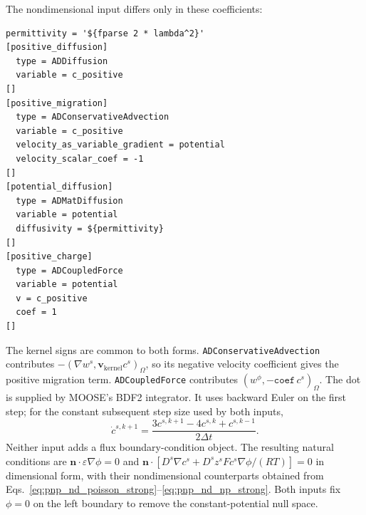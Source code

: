 \documentclass[3p,times]{elsarticle}
\begin{document}
The nondimensional input differs only in these coefficients:
\begin{lstlisting}[basicstyle=\ttfamily\small,columns=fullflexible]
permittivity = '${fparse 2 * lambda^2}'
[positive_diffusion]
  type = ADDiffusion
  variable = c_positive
[]
[positive_migration]
  type = ADConservativeAdvection
  variable = c_positive
  velocity_as_variable_gradient = potential
  velocity_scalar_coef = -1
[]
[potential_diffusion]
  type = ADMatDiffusion
  variable = potential
  diffusivity = ${permittivity}
[]
[positive_charge]
  type = ADCoupledForce
  variable = potential
  v = c_positive
  coef = 1
[]
\end{lstlisting}

The kernel signs are common to both forms. \texttt{ADConservativeAdvection} contributes $-(\nabla w^s,\boldsymbol{v}_{\mathrm{kernel}}c^s)_\Omega$, so its negative velocity coefficient gives the positive migration term. \texttt{ADCoupledForce} contributes $(w^\phi,-\texttt{coef}\,c^s)_\Omega$. The dot is supplied by MOOSE's BDF2 integrator. It uses backward Euler on the first step; for the constant subsequent step size used by both inputs,
\begin{equation}
  \dot{c}^{s,k+1}=\frac{3c^{s,k+1}-4c^{s,k}+c^{s,k-1}}{2\Delta t}.
\end{equation}
Neither input adds a flux boundary-condition object. The resulting natural conditions are $\boldsymbol{n}\cdot\varepsilon\nabla\phi=0$ and $\boldsymbol{n}\cdot[D^s\nabla c^s+D^sz^sF c^s\nabla\phi/(RT)]=0$ in dimensional form, with their nondimensional counterparts obtained from Eqs.~\eqref{eq:pnp_nd_poisson_strong}--\eqref{eq:pnp_nd_np_strong}. Both inputs fix $\phi=0$ on the left boundary to remove the constant-potential null space.



\end{document}
